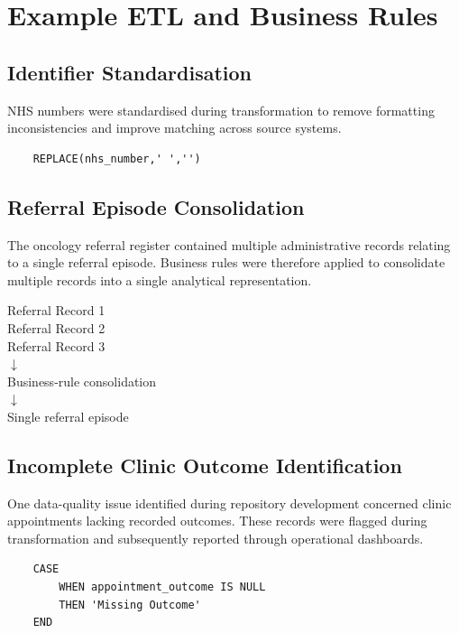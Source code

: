 \chapter{Example ETL and Business Rules}\label{appendix:etl}

\section{Identifier Standardisation}
NHS numbers were standardised during transformation to remove formatting inconsistencies and improve matching across source systems. 

\begin{verbatim} 
    REPLACE(nhs_number,' ','') 
\end{verbatim}

\section{Referral Episode Consolidation} 

The oncology referral register contained multiple administrative records relating to a single referral episode. Business rules were therefore applied to consolidate multiple records into a single analytical representation. 

\begin{center} 
Referral Record 1\\ 
Referral Record 2\\ 
Referral Record 3\\ 
$\downarrow$\\ 
Business-rule consolidation\\ 
$\downarrow$\\ 
Single referral episode 
\end{center}

\section{Incomplete Clinic Outcome Identification} 

One data-quality issue identified during repository development concerned clinic appointments lacking recorded outcomes. These records were flagged during transformation and subsequently reported through operational dashboards. 

\begin{verbatim} 
    CASE 
        WHEN appointment_outcome IS NULL
        THEN 'Missing Outcome' 
    END 
\end{verbatim}

